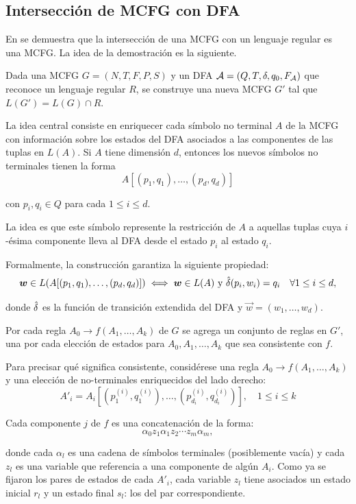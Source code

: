 \subsection{Intersección de MCFG con DFA}

En \cite{Seki1991OnMC} se demuestra que la intersección de una MCFG con un lenguaje regular es una MCFG. La idea de la demostración es la siguiente.

Dada una MCFG $G = (N, T, F, P, S)$ y un DFA $\mathcal{A} = (Q, T, \delta, q_0, F_{\mathcal{A}})$ que reconoce un lenguaje regular $R$, se construye     una nueva MCFG $G'$ tal que $L(G') = L(G) \cap R$.

La idea central consiste en enriquecer cada símbolo no terminal $A$ de la MCFG con información sobre los estados del DFA asociados a las componentes de las tuplas en $L(A)$. Si $A$ tiene dimensión $d$, entonces los nuevos símbolos no terminales tienen la forma
$$
    A[(p_1, q_1), \ldots, (p_d, q_d)]
$$

con $p_i,q_i \in Q$ para cada $1 \leq i \leq d$.

La idea es que este símbolo represente la restricción de $A$ a aquellas tuplas cuya $i$-ésima componente lleva al DFA desde el estado $p_i$ al estado $q_i$.

Formalmente, la construcción garantiza la siguiente propiedad:
\begin{equation}
    \label{eq:intersection-invariant}
    \boldsymbol{w} \in L(A[(p_1, q_1), \ldots, (p_d, q_d)]) \iff \boldsymbol{w} \in L(A) \text{ y } \hat{\delta}(p_i, w_i) = q_i \quad
    \forall 1 \leq i \leq d,
\end{equation}

donde $\hat{\delta}$ es la función de transición extendida del DFA y $\vec w = (w_1, \ldots, w_d)$.

Por cada regla $A_0 \to f(A_1, \dots, A_k)$ de $G$ se agrega un conjunto de reglas en $G'$, una por cada elección de estados para $A_0, A_1, \ldots, A_k$ que sea consistente con $f$.

Para precisar qué significa \lquoti consistente\rquoti, considérese una regla $A_0 \to f(A_1, \dots, A_k)$ y una elección de no-terminales enriquecidos del lado derecho:
$$
    A'_i = A_i[(p_1^{(i)}, q_1^{(i)}), \ldots, (p_{d_i}^{(i)}, q_{d_i}^{(i)})], \quad 1 \leq i \leq k
$$

Cada componente $j$ de $f$ es una concatenación de la forma:
$$
    \alpha_0 z_1 \alpha_1 z_2 \cdots z_m \alpha_m,
$$

donde cada $\alpha_l$ es una cadena de símbolos terminales (posiblemente vacía) y cada $z_l$ es una variable que referencia a una componente de algún $A_i$. Como ya se fijaron los pares de estados de cada $A'_i$, cada variable $z_l$ tiene asociados un estado inicial $r_l$ y un estado final $s_l$: los del par correspondiente.

